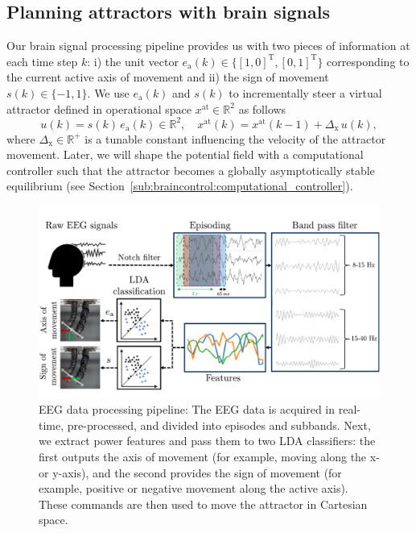 \subsection{Planning attractors with brain signals}\label{sub:braincontrol:planning_attractors_switching}
Our brain signal processing pipeline provides us with two pieces of information at each time step $k$: i) the unit vector $e_\mathrm{a}(k) \in \{ [1, 0]^\mathrm{T}, [0, 1]^\mathrm{T} \}$ corresponding to the current active axis of movement %
and ii) the sign of movement $s(k) \in \{ -1, 1 \}$. We use $e_\mathrm{a}(k)$ and $s(k)$ to incrementally steer a virtual attractor defined in operational space $x^\mathrm{at} \in \mathbb{R}^2$ as follows
%
\begin{equation}
    u(k) = s(k) \, e_\mathrm{a}(k) \in \mathbb{R}^2, \quad  x^\mathrm{at}(k) = x^\mathrm{at}(k-1) + \Delta_\mathrm{x} \, u(k),
\end{equation}
where $\Delta_\mathrm{x} \in \mathbb{R}^+$ is a tunable constant influencing the velocity of the attractor movement.
%
Later, we will shape the potential field with a computational controller such that the attractor becomes a globally asymptotically stable equilibrium (see Section~\ref{sub:braincontrol:computational_controller}).

\begin{figure}
\begin{center}
    \includegraphics[width=\columnwidth]{braincontrol/figures/eeg_pipeline/eeg_pipeline_v3_compressed.pdf}
    \caption{EEG data processing pipeline: The EEG data is acquired in real-time, pre-processed, and divided into episodes and subbands. Next, we extract power features and pass them to two LDA classifiers: the first outputs the axis of movement (for example, moving along the x- or y-axis), and the second provides the sign of movement (for example, positive or negative movement along the active axis). These commands are then used to move the attractor in Cartesian space.}
    \label{fig:braincontrol:eeg_pipeline}
\end{center}
\end{figure}

